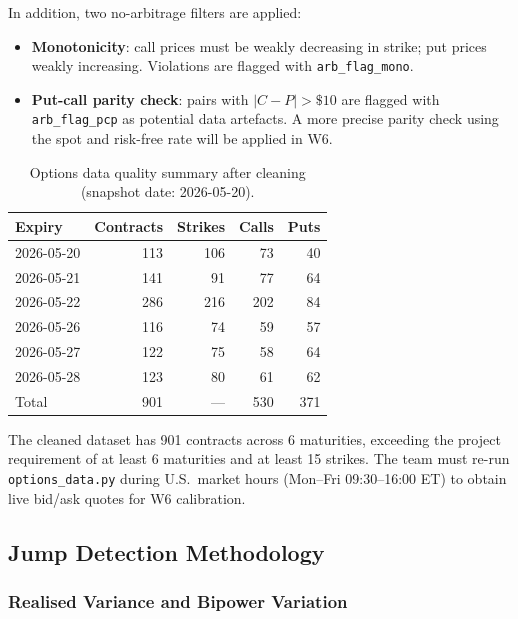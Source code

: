 \documentclass[12pt]{article}
\begin{document}
In addition, two no-arbitrage filters are applied:
\begin{itemize}
  \item \textbf{Monotonicity}: call prices must be weakly decreasing in strike; put prices weakly increasing. Violations are flagged with \texttt{arb\_flag\_mono}.
  \item \textbf{Put-call parity check}: pairs with $|C-P|>\$10$ are flagged with \texttt{arb\_flag\_pcp} as potential data artefacts. A more precise parity check using the spot and risk-free rate will be applied in W6.
\end{itemize}

\begin{table}[H]
\centering
\caption{Options data quality summary after cleaning (snapshot date: 2026-05-20).}
\label{tab:options-quality}
\begin{tabular}{lrrrr}
\toprule
Expiry & Contracts & Strikes & Calls & Puts \\
\midrule
2026-05-20 & 113 & 106 &  73 &  40 \\
2026-05-21 & 141 &  91 &  77 &  64 \\
2026-05-22 & 286 & 216 & 202 &  84 \\
2026-05-26 & 116 &  74 &  59 &  57 \\
2026-05-27 & 122 &  75 &  58 &  64 \\
2026-05-28 & 123 &  80 &  61 &  62 \\
\midrule
Total & 901 & --- & 530 & 371 \\
\bottomrule
\end{tabular}
\end{table}

The cleaned dataset has 901 contracts across 6 maturities, exceeding the project requirement of at least 6 maturities and at least 15 strikes. The team must re-run \texttt{options\_data.py} during U.S.\ market hours (Mon--Fri 09:30--16:00 ET) to obtain live bid/ask quotes for W6 calibration.

\subsection*{Jump Detection Methodology}
\label{sec:diagnostic}

\subsubsection*{Realised Variance and Bipower Variation}
\end{document}
